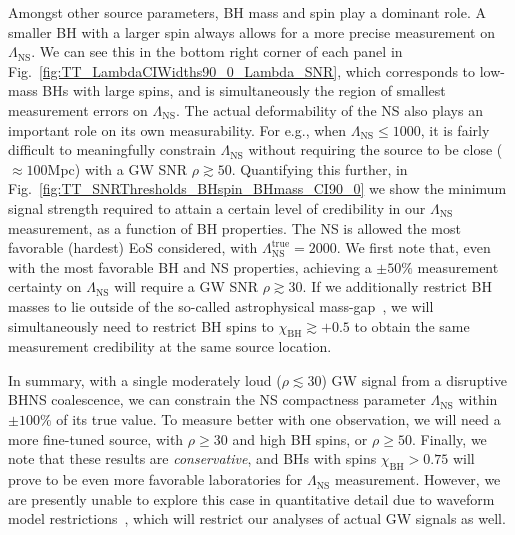 \documentclass[aps,prd,amsmath,floats,floatfix, twocolumn,
superscriptaddress,nofootinbib,showpacs]{revtex4-1}
\newcommand{\lambdans}{\Lambda_\mathrm{NS}}
\newcommand{\chibh}{\chi_\mathrm{BH}}
\begin{document}
Amongst other source parameters, BH mass and spin play a dominant role. A smaller
BH with a larger spin always allows for a more precise measurement on $\lambdans$.
We can see this in the bottom right corner of each panel in
Fig.~\ref{fig:TT_LambdaCIWidths90_0_Lambda_SNR}, which corresponds to low-mass BHs
with large spins, and is simultaneously the region of smallest measurement errors on $\lambdans$.
The actual deformability of the NS also plays an important role on its own
measurability. For e.g., when $\lambdans\leq 1000$, it is fairly difficult
to meaningfully constrain $\lambdans$ without requiring the source to be
close ($\approx 100$Mpc) with a GW SNR $\rho\gtrsim 50$. Quantifying this further,
in Fig.~\ref{fig:TT_SNRThresholds_BHspin_BHmass_CI90_0} we show the minimum
signal strength required to attain a certain level of credibility in our
$\lambdans$ measurement, as a function of BH properties. The NS is allowed
the most favorable (hardest) EoS considered, with $\lambdans^\mathrm{true}=2000$.
% 
We first note that, even with the most favorable BH and NS properties, achieving
a $\pm 50\%$ measurement certainty on $\lambdans$ will require a GW SNR
$\rho\gtrsim 30$. If we additionally restrict BH masses to lie outside of the so-called
astrophysical mass-gap~\cite{Bailyn:1997xt,Kalogera:1996ci,Kreidberg:2012,
Littenberg:2015tpa}, we will simultaneously need to restrict BH spins
to $\chibh\gtrsim +0.5$ to obtain the same measurement credibility at the same
source location.



In summary, with a single moderately loud ($\rho\lesssim 30$) GW signal from
a disruptive BHNS coalescence, we can constrain
the NS compactness parameter $\lambdans$ within $\pm 100\%$ of its true value.
To measure better with one observation, we will need a more fine-tuned source, with
$\rho\geq 30$ and high BH spins, or $\rho\geq 50$.
% 
Finally, we note that these results are {\it conservative}, and 
BHs with spins $\chibh > 0.75$ will prove to be even more favorable laboratories
for $\lambdans$ measurement. However, we are presently unable to explore this case
in quantitative detail due to waveform model restrictions~\cite{Lackey:2013axa},
which will restrict our analyses of actual GW signals as well.



\end{document}
